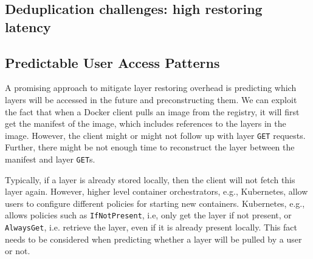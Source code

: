 \subsection{Deduplication challenges: high restoring latency}

\subsection{Predictable User Access Patterns}
\label{sec:predictable-user-access}


%
%
A promising approach to mitigate layer restoring overhead is predicting which layers will be accessed in the future and preconstructing them.
%
%
%
We can exploit the fact that when a Docker client pulls an image
from the registry, it will first get the manifest of the
image, which includes references to the layers in the image.
%
%
%
%
However, the client might or might not follow up with layer \texttt{GET} requests.
%
Further, there might be not enough time to reconstruct the layer
between the manifest and layer \texttt{GET}s.


%
Typically, if a layer is already stored locally, then the client will not
fetch this layer again.
%
However, higher level container orchestrators, e.g., Kubernetes, allow users to configure different policies
for starting new containers. Kubernetes, e.g., allows policies such as
\texttt{IfNotPresent}, i.e,  only get the layer if not present, or \texttt{AlwaysGet}, i.e.
retrieve the layer, even if it is already present locally.
%
This fact needs to be considered when predicting whether a layer will
be pulled by a user or not.

